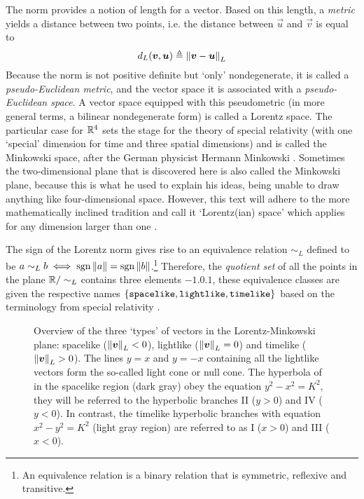 The norm provides a notion of length for a vector. Based on this length, a \emph{metric} yields a distance between two points, i.e. the distance between \(\vec{u}\) and \(\vec{v}\) is equal to 
\[
     d_L(\vb*{v}, \vb*{u}) \triangleq \norm{\vb*{v} - \vb*{u}}_L
\] 
Because the norm is not positive definite but `only' nondegenerate, it is called a \emph{pseudo-Euclidean metric}, and the vector space it is associated with a \emph{pseudo-Euclidean space}. A vector space equipped with this pseudometric (in more general terms, a bilinear nondegenerate form) is called a Lorentz space. The particular case for \(\mathbb{R}^4\) sets the stage for the theory of special relativity (with one `special' dimension for time and three spatial dimensions) and is called the Minkowski space, after the German physicist Hermann Minkowski \cite{Catoni2008}. Sometimes the two-dimensional plane that is discovered here is also called the Minkowski plane, because this is what he used to explain his ideas, being unable to draw anything like four-dimensional space. However, this text will adhere to the more mathematically inclined tradition and call it `Lorentz(ian) space' which applies for any dimension larger than one \cite{Ratcliffe2019}. 

The sign of the Lorentz norm gives rise to an equivalence relation \(\sim_L\) defined to be \(a \sim_L b \iff \operatorname{sgn}{\norm{a}} = \operatorname{sgn}{\norm{b}}\).\footnote{An equivalence relation is a binary relation that is symmetric, reflexive and transitive.} Therefore, the \emph{quotient set} of all the points in the plane \(\mathbb{R} / \sim_L \) contains three elements \(\qty{-1, 0, 1}\), these equivalence classes are given the respective names \(\qty{\text{\texttt{spacelike}}, \text{\texttt{lightlike}}, \text{\texttt{timelike}}}\) based on the terminology from special relativity \cite{Landau1971}.

\begin{figure}[ht]
    \centering
    
    \caption{Overview of the three `types' of vectors in the Lorentz-Minkowski plane: spacelike (\(\norm{\vb*{v}}_L < 0\)), lightlike (\(\norm{\vb*{v}}_L = 0\)) and timelike (\(\norm{\vb*{v}}_L > 0\)). The lines \(y = x\) and \(y = -x\) containing all the lightlike vectors form the so-called light cone or null cone. The hyperbola of in the spacelike region (dark gray) obey the equation \(y^2 - x^2 = K^2\), they will be referred to the hyperbolic branches II (\(y > 0\)) and IV (\(y < 0\)). In contrast, the timelike hyperbolic branches with equation \(x^2 - y^2 = K^2\) (light gray region) are referred to as I (\(x > 0\)) and III (\(x < 0\)).}
    \label{fig:lightlike_spacelike}
\end{figure}

